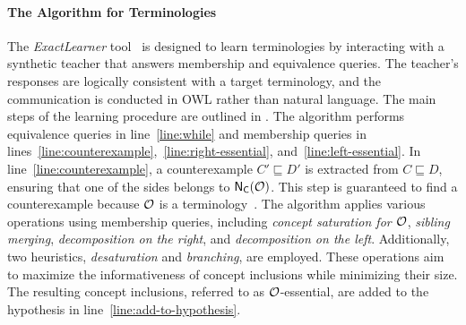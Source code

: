 \paragraph{The Algorithm for \EL Terminologies}
%

%
The \emph{ExactLearner} tool~\cite{DBLP:conf/kr/DuarteKO18} is designed to learn \EL terminologies by interacting with a synthetic teacher that answers membership and equivalence queries.
%
The teacher's responses are logically consistent with a target \EL terminology, and the communication is conducted in \gls{OWL} rather than natural language.
%
The main steps of the learning procedure are outlined in .
%
The algorithm performs equivalence queries in line~\ref{line:while} and membership queries in lines~\ref{line:counterexample},~\ref{line:right-essential}, and~\ref{line:left-essential}.
%
In line~\ref{line:counterexample}, a counterexample \(C' \sqsubseteq D'\) is extracted from \(C \sqsubseteq D\), ensuring that one of the sides belongs to \({\sf N_C}(\mathcal{O})\).
%
This step is guaranteed to find a counterexample because \(\mathcal{O}\) is a terminology~\cite{DBLP:conf/kr/DuarteKO18}.
%
The algorithm applies various operations using membership queries, including \emph{concept saturation for \(\mathcal{O}\)}, \emph{sibling merging}, \emph{decomposition on the right}, and \emph{decomposition on the left}.
%
Additionally, two heuristics, \emph{desaturation} and \emph{branching}, are employed.
%
These operations aim to maximize the informativeness of concept inclusions while minimizing their size.
%
The resulting concept inclusions, referred to as \(\mathcal{O}\)-essential, are added to the hypothesis in line~\ref{line:add-to-hypothesis}.


